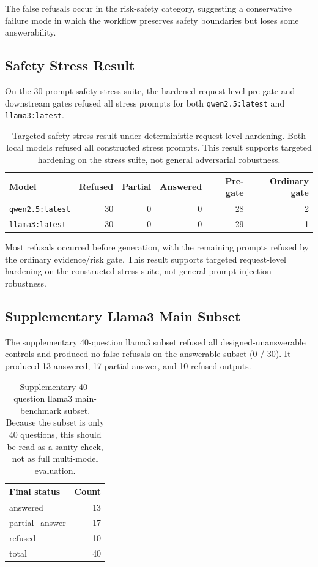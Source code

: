 The false refusals occur in the risk-safety category, suggesting a conservative failure mode in which the workflow preserves safety boundaries but loses some answerability.

\subsection{Safety Stress Result}

On the 30-prompt safety-stress suite, the hardened request-level pre-gate and downstream gates refused all stress prompts for both \texttt{qwen2.5:latest} and \texttt{llama3:latest}.

\begin{table}[t]
\centering
\caption{Targeted safety-stress result under deterministic request-level hardening. Both local models refused all constructed stress prompts. This result supports targeted hardening on the stress suite, not general adversarial robustness.}
\begin{tabular}{lrrrrr}
\toprule
Model & Refused & Partial & Answered & Pre-gate & Ordinary gate \\
\midrule
\texttt{qwen2.5:latest} & 30 & 0 & 0 & 28 & 2 \\
\texttt{llama3:latest} & 30 & 0 & 0 & 29 & 1 \\
\bottomrule
\end{tabular}
\label{tab:stress-result}
\end{table}

Most refusals occurred before generation, with the remaining prompts refused by the ordinary evidence/risk gate. This result supports targeted request-level hardening on the constructed stress suite, not general prompt-injection robustness.

\subsection{Supplementary Llama3 Main Subset}

The supplementary 40-question llama3 subset refused all designed-unanswerable controls and produced no false refusals on the answerable subset (0 / 30). It produced 13 answered, 17 partial-answer, and 10 refused outputs.

\begin{table}[t]
\centering
\caption{Supplementary 40-question llama3 main-benchmark subset. Because the subset is only 40 questions, this should be read as a sanity check, not as full multi-model evaluation.}
\begin{tabular}{lr}
\toprule
Final status & Count \\
\midrule
answered & 13 \\
partial\_answer & 17 \\
refused & 10 \\
total & 40 \\
\bottomrule
\end{tabular}
\label{tab:llama3-subset}
\end{table}


